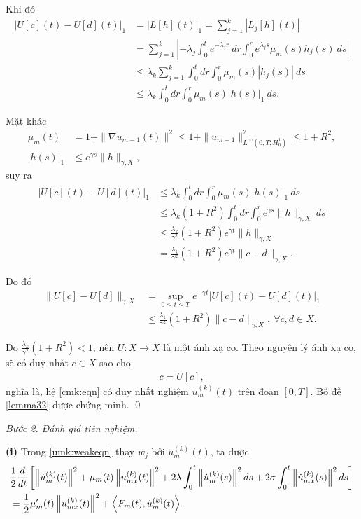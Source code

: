 \documentclass[12pt,a4paper]{article}
\theoremstyle{definition}
\theoremstyle{definition}
\begin{document}
Khi đó
\begin{align*}
    |U[c](t) - U[d](t)|_1
    &= |L[h](t)|_1 = \sum_{j=1}^k |L_j[h](t)| \\
    &= \sum_{j=1}^k \left| -\lambda_j \int_0^t e^{-\overline{\lambda}_j r} \: dr \int_0^r e^{\overline{\lambda}_j s} \mu_m(s) h_j(s) \: ds \right| \\
    & \le \lambda_k \sum_{j=1}^k \int_0^t dr \int_0^r \mu_m(s) |h_j(s)| \: ds \\
    &\le \lambda_k \int_0^t dr \int_0^r \mu_m(s)|h(s)|_1 \: ds.
\end{align*}

Mặt khác
\begin{align*}
    \mu_m(t) &= 1 + \|\nabla u_{m-1}(t)\|^2 \le 1 + \|u_{m-1}\|^2_{L^\infty(0,T;H^1_0)} \le 1 + R^2, \\
    |h(s)|_1 &\le e^{\gamma s} \|h\|_{\gamma,X},
\end{align*}
suy ra
\begin{align*}
    |U[c](t) - U[d](t)|_1
    &\le \lambda_k \int_0^t dr \int_0^r \mu_m(s)|h(s)|_1 \: ds \\
    &\le \lambda_k (1+R^2) \int_0^t dr \int_0^r e^{\gamma s} \|h\|_{\gamma,X} \: ds \\
    &\le \frac{\lambda_k}{\gamma^2}(1+R^2) e^{\gamma t} \|h\|_{\gamma,X} \\
    &= \frac{\lambda_k}{\gamma^2}(1+R^2) e^{\gamma t} \|c - d\|_{\gamma,X}.
\end{align*}

Do đó
\begin{align*}
    \|U[c] - U[d]\|_{\gamma,X}
    &= \sup_{0\le t \le T} e^{-\gamma t} |U[c](t) - U[d](t)|_1 \\
    &\le \frac{\lambda_k}{\gamma^2}(1+R^2)\|c-d\|_{\gamma,X}, \ \forall c,d \in X.
\end{align*}

Do $\frac{\lambda_k}{\gamma^2} (1+R^2) < 1$, nên $U \colon X \to X$ là một ánh xạ co. Theo nguyên lý ánh xạ co, sẽ có duy nhất $c \in X$ sao cho
\begin{align*}
    c = U[c],
\end{align*}
nghĩa là, hệ \eqref{cmk:eqn} có duy nhất nghiệm $u_m^{(k)}(t)$ trên đoạn $[0,T]$. Bổ đề \ref{lemma32} được chứng minh. \qed

\textit{Bước 2. Đánh giá tiên nghiệm.}

\textbf{(i)} Trong \eqref{umk:weakeqn} thay $w_j$ bởi $\dot{u}_m^{(k)}(t)$, ta được
\begin{align} \label{319}
    &\frac{1}{2} \frac{d}{dt} \left[ \left\|\dot{u}_m^{(k)}(t)\right\|^2 + \mu_m(t) \left\|u_{mx}^{(k)}(t)\right\|^2 + 2 \lambda \int_0^t \left\|\dot{u}_m^{(k)}(s)\right\|^2  ds + 2 \sigma \int_0^t \left\|\dot{u}_{mx}^{(k)}(s)\right\|^2  ds \right] \\
    &= \frac{1}{2} \mu'_m(t) \left\|u_{mx}^{(k)}(t)\right\|^2 + \left<F_m(t), \dot{u}_m^{(k)}(t)\right>. \notag
\end{align}
\end{document}
